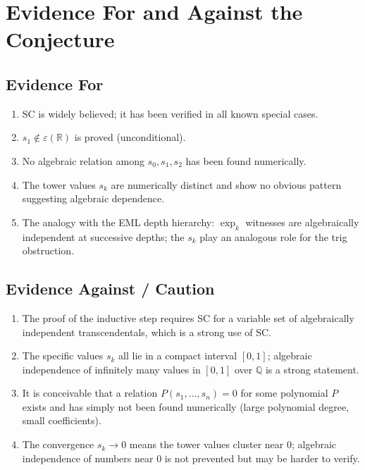 \documentclass[11pt]{article}
\begin{document}
\section{Evidence For and Against the Conjecture}

\subsection{Evidence For}

\begin{enumerate}
  \item SC is widely believed; it has been verified in all known special cases.
  \item $s_1\notin\varepsilon(\mathbb{R})$ is proved (unconditional).
  \item No algebraic relation among $s_0,s_1,s_2$ has been found numerically.
  \item The tower values $s_k$ are numerically distinct and show no obvious pattern
    suggesting algebraic dependence.
  \item The analogy with the EML depth hierarchy: $\exp_k$ witnesses are algebraically
    independent at successive depths; the $s_k$ play an analogous role for the trig obstruction.
\end{enumerate}

\subsection{Evidence Against / Caution}

\begin{enumerate}
  \item The proof of the inductive step requires SC for a variable set of algebraically
    independent transcendentals, which is a strong use of SC.
  \item The specific values $s_k$ all lie in a compact interval $[0,1]$;
    algebraic independence of infinitely many values in $[0,1]$ over $\mathbb{Q}$ is a
    strong statement.
  \item It is conceivable that a relation $P(s_1,\ldots,s_n)=0$ for some polynomial $P$
    exists and has simply not been found numerically (large polynomial degree, small coefficients).
  \item The convergence $s_k\to0$ means the tower values cluster near $0$;
    algebraic independence of numbers near $0$ is not prevented but may be harder to verify.
\end{enumerate}
\end{document}
